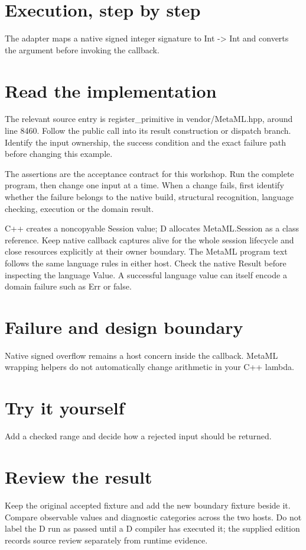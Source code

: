 
\section*{Execution, step by step}
The adapter maps a native signed integer signature to Int -> Int and converts the argument before invoking the callback.

\section*{Read the implementation}
The relevant source entry is register\_primitive in vendor/MetaML.hpp, around line 8460. Follow the public call into its result construction or dispatch branch. Identify the input ownership, the success condition and the exact failure path before changing this example.

The assertions are the acceptance contract for this workshop. Run the complete program, then change one input at a time. When a change fails, first identify whether the failure belongs to the native build, structural recognition, language checking, execution or the domain result.

\clearpage
{}
C++ creates a noncopyable Session value; D allocates MetaML.Session as a class reference. Keep native callback captures alive for the whole session lifecycle and close resources explicitly at their owner boundary. The MetaML program text follows the same language rules in either host. Check the native Result before inspecting the language Value. A successful language value can itself encode a domain failure such as Err or false.


\section*{Failure and design boundary}
Native signed overflow remains a host concern inside the callback. MetaML wrapping helpers do not automatically change arithmetic in your C++ lambda.

\section*{Try it yourself}
Add a checked range and decide how a rejected input should be returned.

\section*{Review the result}
Keep the original accepted fixture and add the new boundary fixture beside it. Compare observable values and diagnostic categories across the two hosts. Do not label the D run as passed until a D compiler has executed it; the supplied edition records source review separately from runtime evidence.

